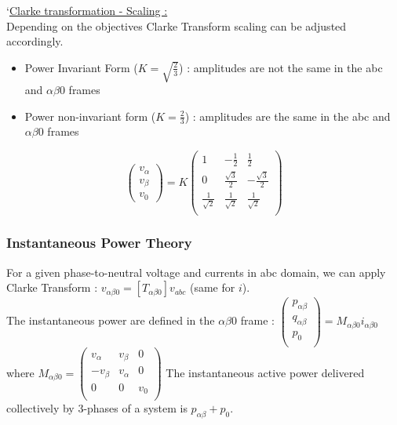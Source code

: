 \documentclass[../main.tex]{subfiles}
\begin{document}
\quad `\underline{Clarke transformation - Scaling :}\\
Depending on the objectives Clarke Transform scaling can be adjusted accordingly.
\begin{itemize}
    \item Power Invariant Form ($K = \sqrt{\frac{2}{3}}$) : amplitudes are not the same in the abc and $\alpha \beta 0$ frames
    \item Power non-invariant form ($K = \frac{2}{3}$) : amplitudes are the same in the abc and $\alpha \beta 0$ frames
\end{itemize}
\begin{equation}
    \begin{pmatrix}
        v_\alpha \\ v_\beta \\v_0
    \end{pmatrix} = K \begin{pmatrix}
        1 & -\frac{1}{2} & \frac{1}{2}\\
        0 & \frac{\sqrt{3}}{2} & -\frac{\sqrt{3}}{2}\\
        \frac{1}{\sqrt{2}} & \frac{1}{\sqrt{2}} & \frac{1}{\sqrt{2}}\\
    \end{pmatrix}
\end{equation}


\subsubsection{Instantaneous Power Theory}
For a given phase-to-neutral voltage and currents in abc domain, we can apply Clarke Transform : $v_{\alpha \beta 0} = [T_{\alpha \beta 0}] v_{abc}$ (same for $i$).\\
The instantaneous power are defined in the $\alpha \beta 0$ frame : $\begin{pmatrix}
    p_{\alpha \beta}\\ q_{\alpha \beta} \\ p_0\\
\end{pmatrix} = M_{\alpha \beta 0} i_{\alpha \beta 0}$ where $M_{\alpha \beta 0} = \begin{pmatrix}
    v_\alpha & v_\beta & 0 \\
    -v_\beta & v_\alpha & 0\\
    0 & 0 & v_0\\
\end{pmatrix}$
The instantaneous active power delivered collectively by 3-phases of a system is $p_{\alpha \beta} + p_0$.\\
\end{document}
